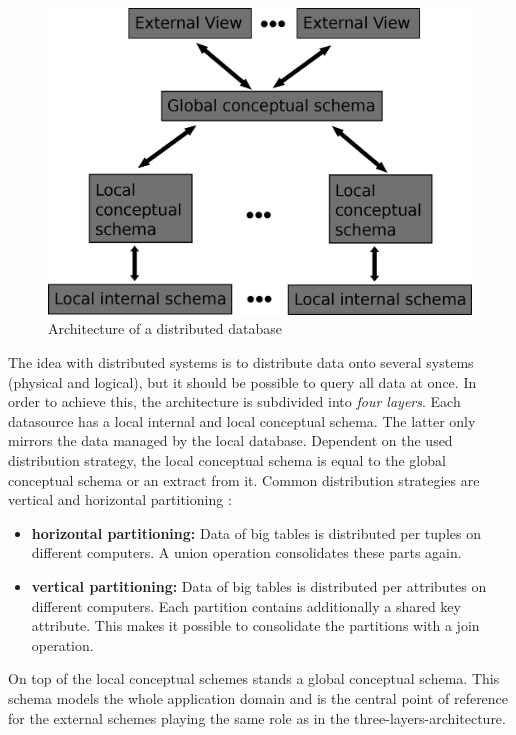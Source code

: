 \begin{figure}[H]
	\begin{center}
		\includegraphics[scale=0.5]{figures/distributedDatabaseArchitecture.png}
	\end{center}
	\caption{Architecture of a distributed database \cite[p. 92]{DBLP:books/dp/LeserN2006}}
	\label{DistributedDatabaseArchitecture}
\end{figure}


The idea with distributed systems is to distribute data onto several systems (physical and logical), but it should be possible to query all data at once. In order to achieve this, the architecture is subdivided into \textit{four layers}. Each datasource has a local internal and local conceptual schema. The latter only mirrors the data managed by the local database. Dependent on the used distribution strategy, the local conceptual schema is equal to the global conceptual schema  or an extract from it. Common distribution strategies are vertical and horizontal partitioning \cite[p. 92]{DBLP:books/dp/LeserN2006}: 
\begin{itemize}
\item \textbf{horizontal partitioning:} Data of big tables is distributed per tuples on different computers. A union operation consolidates these parts again.
\item \textbf{vertical partitioning:} Data of big tables is distributed per attributes on different computers. Each partition contains additionally a shared key attribute. This makes it possible to consolidate the partitions with a join operation.
\end{itemize}
On top of the local conceptual schemes stands a global conceptual schema. This schema models the whole application domain and is the central point of reference for the external schemes playing the same role as in the three-layers-architecture.

